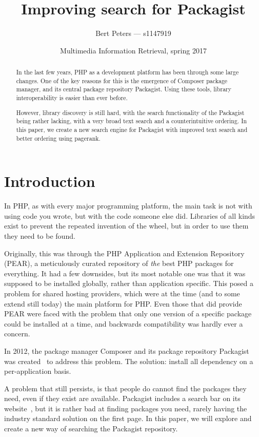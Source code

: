 \documentclass{article}
\title{Improving search for Packagist}
\author{Bert Peters --- s1147919}
\date{Multimedia Information Retrieval, spring 2017}
\begin{document}
\maketitle

\begin{abstract}
	In the last few years, PHP as a development platform has been through some large changes. One of the key reasons for this is the emergence of Composer package manager, and its central package repository Packagist. Using these tools, library interoperability is easier than ever before.

	However, library discovery is still hard, with the search functionality of the Packagist being rather lacking, with a very broad text search and a counterintuitive ordering. In this paper, we create a new search engine for Packagist with improved text search and better ordering using pagerank.
\end{abstract}

\section{Introduction}

In PHP, as with every major programming platform, the main task is not with using code you wrote, but with the code someone else did. Libraries of all kinds exist to prevent the repeated invention of the wheel, but in order to use them they need to be found.

Originally, this was through the PHP Application and Extension Repository (PEAR), a meticulously curated repository of \emph{the} best PHP packages for everything. It had a few downsides, but its most notable one was that it was supposed to be installed globally, rather than application specific. This posed a problem for shared hosting providers, which were at the time (and to some extend still today) the main platform for PHP. Even those that did provide PEAR were faced with the problem that only one version of a specific package could be installed at a time, and backwards compatibility was hardly ever a concern.

In 2012, the package manager Composer and its package repository Packagist was created~\cite{composer-release} to address this problem. The solution: install all dependency on a per-application basis.

A problem that still persists, is that people do cannot find the packages they need, even if they exist are available. Packagist includes a search bar on its website~\cite{packagist}, but it is rather bad at finding packages you need, rarely having the industry standard solution on the first page. In this paper, we will explore and create a new way of searching the Packagist repository.
\end{document}
